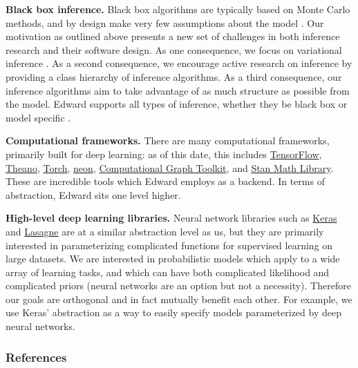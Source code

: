 \textbf{Black box inference.}
Black box algorithms are typically based on Monte Carlo methods, and
by design make very few assumptions about the
model \citep{metropolis1949monte,hastings1970monte}.
Our motivation as outlined above presents a new set of
challenges in both inference research and their software design.
As one consequence, we focus on variational
inference \citep{hinton1993keeping,waterhouse1996bayesian,jordan1999introduction}.
As a second consequence, we encourage active research
on inference by providing a class hierarchy of inference algorithms.
As a third consequence, our inference
algorithms aim to take advantage of as much structure as possible from
the model. Edward supports all types of inference, whether they
be black box or model specific \citep{dempster1977maximum,hoffman2013stochastic}.

\textbf{Computational frameworks.}
There are many computational frameworks, primarily built for deep
learning: as of this date, this includes
\href{https://www.tensorflow.org}{TensorFlow},
\href{http://deeplearning.net/software/theano/}{Theano},
\href{http://torch.ch}{Torch},
\href{https://github.com/NervanaSystems/neon}{neon},
\href{http://rll.berkeley.edu/cgt/}{Computational Graph Toolkit}, and
\href{https://github.com/stan-dev/math}{Stan Math Library}. These are
incredible tools which Edward employs as a backend. In
terms of abstraction, Edward sits one level higher.

\textbf{High-level deep learning libraries.}
Neural network libraries such as
\href{https://github.com/fchollet/keras}{Keras} and
\href{https://github.com/Lasagne/Lasagne}{Lasagne} are at a similar
abstraction level as us, but they are primarily interested in
parameterizing complicated functions for supervised learning on large
datasets. We are interested in probabilistic models which apply
to a wide array of learning tasks, and which can have both
complicated likelihood and complicated priors (neural networks are an
option but not a necessity). Therefore our goals are orthogonal and in
fact mutually benefit each other. For example, we use Keras'
abstraction as a way to easily specify models parameterized by deep
neural networks.

\subsubsection{References}\label{references}
